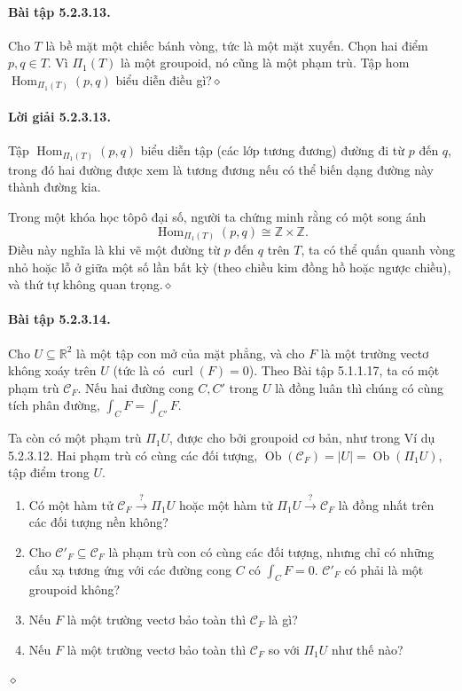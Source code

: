 \paragraph{Bài tập 5.2.3.13.} Cho $T$ là bề mặt một chiếc bánh vòng, tức là một mặt xuyến. Chọn hai điểm $p,q\in T$. Vì $\Pi_1(T)$ là một groupoid, nó cũng là một phạm trù. Tập hom $\operatorname{Hom}_{\Pi_1(T)}(p,q)$ biểu diễn điều gì?\hfill$\diamond$
\paragraph{Lời giải 5.2.3.13.} Tập $\operatorname{Hom}_{\Pi_1(T)}(p,q)$ biểu diễn tập (các lớp tương đương) đường đi từ $p$ đến $q$, trong đó hai đường được xem là tương đương nếu có thể biến dạng đường này thành đường kia.

Trong một khóa học tôpô đại số, người ta chứng minh rằng có một song ánh
\[
\operatorname{Hom}_{\Pi_1(T)}(p,q)\cong\mathbb Z\times\mathbb Z.
\]
Điều này nghĩa là khi vẽ một đường từ $p$ đến $q$ trên $T$, ta có thể quấn quanh vòng nhỏ hoặc lỗ ở giữa một số lần bất kỳ (theo chiều kim đồng hồ hoặc ngược chiều), và thứ tự không quan trọng.\hfill$\diamond$
\paragraph{Bài tập 5.2.3.14.} Cho $U\subseteq\mathbb R^2$ là một tập con mở của mặt phẳng, và cho $F$ là một trường vectơ không xoáy trên $U$ (tức là có $\operatorname{curl}(F)=0$). Theo Bài tập 5.1.1.17, ta có một phạm trù $\mathcal C_F$. Nếu hai đường cong $C,C'$ trong $U$ là đồng luân thì chúng có cùng tích phân đường, $\int_C F=\int_{C'}F$.

Ta còn có một phạm trù $\Pi_1U$, được cho bởi groupoid cơ bản, như trong Ví dụ 5.2.3.12. Hai phạm trù có cùng các đối tượng, $\operatorname{Ob}(\mathcal C_F)=|U|=\operatorname{Ob}(\Pi_1U)$, tập điểm trong $U$.
\begin{enumerate}[label=\alph*.]
\item Có một hàm tử $\mathcal C_F\xrightarrow{?}\Pi_1U$ hoặc một hàm tử $\Pi_1U\xrightarrow{?}\mathcal C_F$ là đồng nhất trên các đối tượng nền không?
\item Cho $\mathcal C'_F\subseteq\mathcal C_F$ là phạm trù con có cùng các đối tượng, nhưng chỉ có những cấu xạ tương ứng với các đường cong $C$ có $\int_CF=0$. $\mathcal C'_F$ có phải là một groupoid không?
\item Nếu $F$ là một trường vectơ bảo toàn thì $\mathcal C_F$ là gì?
\item Nếu $F$ là một trường vectơ bảo toàn thì $\mathcal C_F$ so với $\Pi_1U$ như thế nào?
\end{enumerate}\hfill$\diamond$
